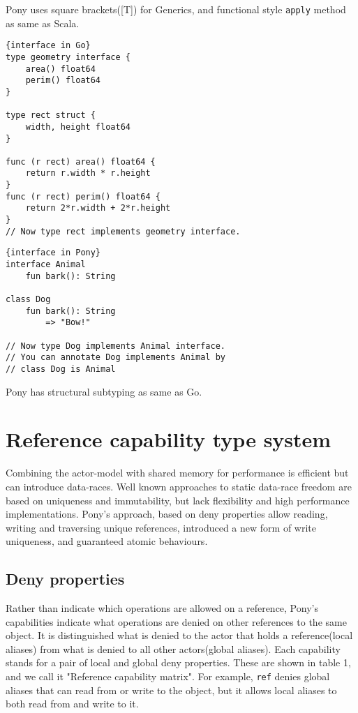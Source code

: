 \documentclass{article}
\begin{document}
Pony uses square brackets([T]) for Generics, and functional style \texttt{apply} method as same as Scala\cite{scala}. \\


\begin{lstlisting}{interface in Go}
type geometry interface {
    area() float64
    perim() float64
}

type rect struct {
    width, height float64
}

func (r rect) area() float64 {
    return r.width * r.height
}
func (r rect) perim() float64 {
    return 2*r.width + 2*r.height
}
// Now type rect implements geometry interface.

\end{lstlisting}

\begin{lstlisting}{interface in Pony}
interface Animal
	fun bark(): String
	
class Dog
	fun bark(): String
		=> "Bow!"	
	
// Now type Dog implements Animal interface.
// You can annotate Dog implements Animal by 
// class Dog is Animal
\end{lstlisting}
 
Pony has structural subtyping as same as Go\cite{go}.

\section{Reference capability type system}
Combining the actor-model with shared memory for performance is efficient but can introduce data-races. Well known approaches to static data-race freedom are based on uniqueness and immutability, but lack flexibility and high performance implementations. Pony's approach, based on deny properties allow reading, writing and traversing unique references, introduced a new form of write uniqueness, and guaranteed atomic behaviours.

\subsection{Deny properties}
Rather than indicate which operations are allowed on a reference, Pony's capabilities indicate what operations are denied on other references to the same object. It is distinguished what is denied to the actor that holds a reference(local aliases) from what is denied to all other actors(global aliases). Each capability stands for a pair of local and global deny properties.
These are shown in table 1\cite{type-proof-paper}, and we call it "Reference capability matrix". For example, \texttt{ref} denies global aliases that can read from or write to the object, but it allows local aliases to both read from and write to it.
\end{document}
